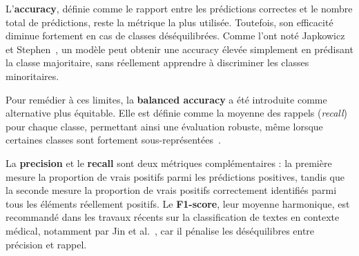 \documentclass[12pt]{report}
\begin{document}
L’\textbf{accuracy}, définie comme le rapport entre les prédictions correctes et le nombre total de prédictions, reste la métrique la plus utilisée. Toutefois, son efficacité diminue fortement en cas de classes déséquilibrées. Comme l’ont noté Japkowicz et Stephen~\cite{japkowicz2002class}, un modèle peut obtenir une accuracy élevée simplement en prédisant la classe majoritaire, sans réellement apprendre à discriminer les classes minoritaires.

Pour remédier à ces limites, la \textbf{balanced accuracy} a été introduite comme alternative plus équitable. Elle est définie comme la moyenne des rappels (\textit{recall}) pour chaque classe, permettant ainsi une évaluation robuste, même lorsque certaines classes sont fortement sous-représentées~\cite{brodersen2010balanced}.

La \textbf{precision} et le \textbf{recall} sont deux métriques complémentaires : la première mesure la proportion de vrais positifs parmi les prédictions positives, tandis que la seconde mesure la proportion de vrais positifs correctement identifiés parmi tous les éléments réellement positifs. Le \textbf{F1-score}, leur moyenne harmonique, est recommandé dans les travaux récents sur la classification de textes en contexte médical, notamment par Jin et al.~\cite{jin2019recurrent}, car il pénalise les déséquilibres entre précision et rappel. 
\end{document}
